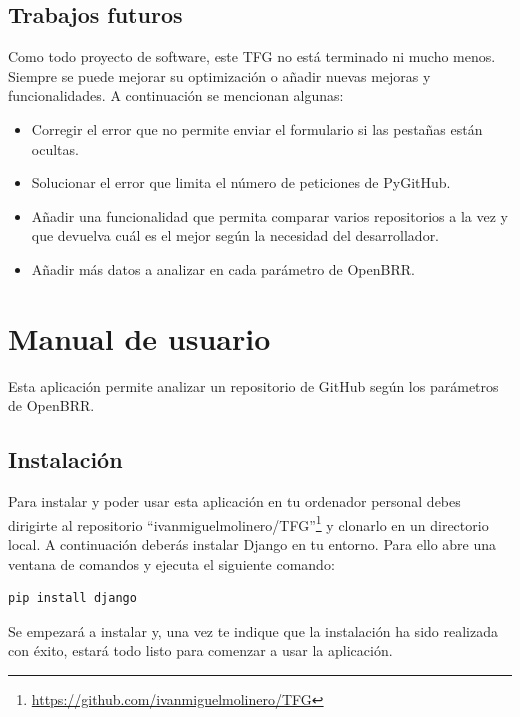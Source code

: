 \documentclass[a4paper, 12pt]{book}
\begin{document}
\section{Trabajos futuros}
\label{sec:trabajos_futuros}
Como todo proyecto de software, este TFG no está terminado ni mucho menos. Siempre se puede mejorar su optimización o añadir nuevas mejoras y funcionalidades. A continuación se mencionan algunas:
\begin{itemize}
	\item Corregir el error que no permite enviar el formulario si las pestañas están ocultas.
	\item Solucionar el error que limita el número de peticiones de PyGitHub.
	\item Añadir una funcionalidad que permita comparar varios repositorios a la vez y que devuelva cuál es el mejor según la necesidad del desarrollador.
	\item Añadir más datos a analizar en cada parámetro de OpenBRR.
\end{itemize}
\cleardoublepage
\appendix
\chapter{Manual de usuario}
\label{app:manual}
Esta aplicación permite analizar un repositorio de GitHub según los parámetros de OpenBRR.
\section{Instalación}
Para instalar y poder usar esta aplicación en tu ordenador personal debes dirigirte al repositorio ``ivanmiguelmolinero/TFG''\footnote{\url{https://github.com/ivanmiguelmolinero/TFG}} y clonarlo en un directorio local. A continuación deberás instalar Django en tu entorno. Para ello abre una ventana de comandos y ejecuta el siguiente comando:
\begin{verbatim}
pip install django
\end{verbatim}
Se empezará a instalar y, una vez te indique que la instalación ha sido realizada con éxito, estará todo listo para comenzar a usar la aplicación.
\end{document}
